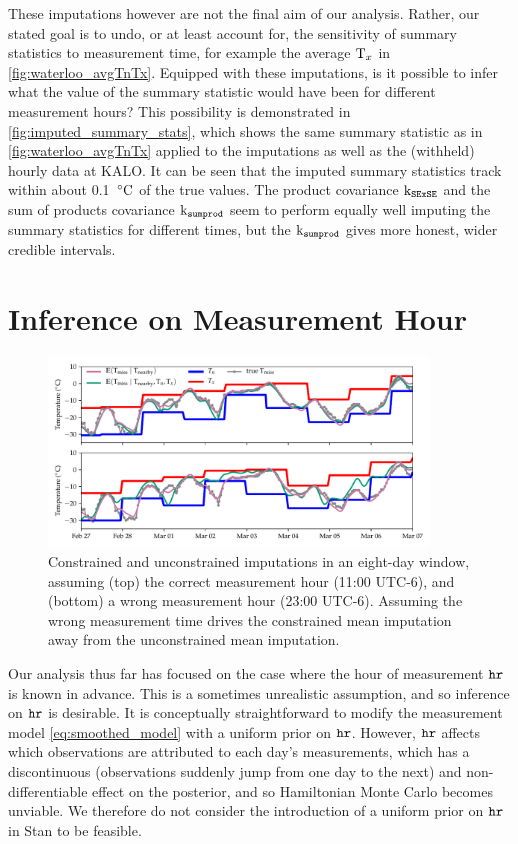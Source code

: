 \documentclass[12pt]{article}
\begin{document}
These imputations however are not the final aim of our analysis.
Rather, our stated goal is to undo, or at least account for, the sensitivity of summary statistics to measurement time, for example the average \(\Tx\) in \autoref{fig:waterloo_avgTnTx}.
Equipped with these imputations, is it possible to infer what the value of the summary statistic would have been for different measurement hours?
This possibility is demonstrated in \autoref{fig:imputed_summary_stats},
which shows the same summary statistic as in \autoref{fig:waterloo_avgTnTx} applied to the imputations as well as the (withheld) hourly data at KALO.
It can be seen that the imputed summary statistics track within about 0.1~\(\degreeC\) of the true values.
The product covariance \(\kSESE\) and the sum of products covariance \(\ksumprod\) seem to perform equally well imputing the summary statistics for different times, but the \(\ksumprod\) gives more honest, wider credible intervals.

\section{Inference on Measurement Hour}\label{inference-on-measurement-hour}

\begin{figure}[tbp]
\centering
\includegraphics[width=0.9\textwidth,height=0.4\textheight,keepaspectratio]{../figures/measure_hour_example.pdf}
\caption{\label{fig:measure_hour_example} Constrained and unconstrained imputations in an eight-day window, assuming (top) the correct measurement hour (11:00 UTC-6), and (bottom) a wrong measurement hour (23:00 UTC-6). Assuming the wrong measurement time drives the constrained mean imputation away from the unconstrained mean imputation.}
\end{figure}

Our analysis thus far has focused on the case where the hour of measurement \(\hour\) is known in advance.
This is a sometimes unrealistic assumption, and so inference on \(\hour\) is desirable.
It is conceptually straightforward to modify the measurement model \autoref{eq:smoothed_model} with a uniform prior on \(\hour\).
However, \(\hour\) affects which observations are attributed to each day's measurements, which has a 
discontinuous (observations suddenly jump from one day to the next) and non-differentiable effect on the posterior, 
and so Hamiltonian Monte Carlo becomes unviable.
We therefore do not consider the introduction of a uniform prior on \(\hour\) in Stan to be feasible.
\end{document}
